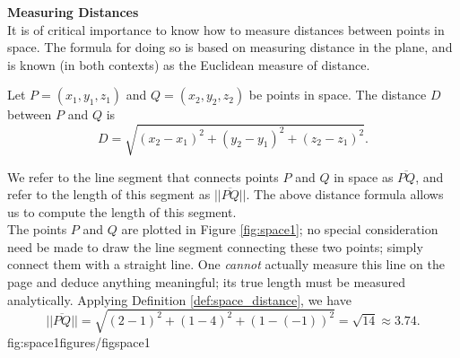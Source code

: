 \noindent\textbf{\large Measuring Distances}\\

It is of critical importance to know how to measure distances between points in space. The formula for doing so is based on measuring distance in the plane, and is known (in both contexts) as the Euclidean measure of distance.

{Let $P=(x_1,y_1,z_1)$ and $Q = (x_2,y_2,z_2)$ be points in space. The distance $D$ between $P$ and $Q$ is 
$$D = \sqrt{(x_2-x_1)^2+(y_2-y_1)^2+(z_2-z_1)^2}.$$
}

We refer to the line segment that connects points $P$ and $Q$ in space as $\overline{PQ}$, and refer to the length of this segment as $||\overline{PQ}||$. The above distance formula allows us to compute the length of this segment.\\

{The points $P$ and $Q$ are plotted in Figure \ref{fig:space1}; no special consideration need be made to draw the line segment connecting these two points; simply connect them with a straight line. One \textit{cannot} actually measure this line on the page and deduce anything meaningful; its true length must be measured analytically. Applying Definition \ref{def:space_distance}, we have
$$||\overline{PQ}|| = \sqrt{(2-1)^2+(1-4)^2+(1-(-1))^2} = \sqrt{14}\approx 3.74.$$
%
{fig:space1}{figures/figspace1}
\baselineskip
}\\

